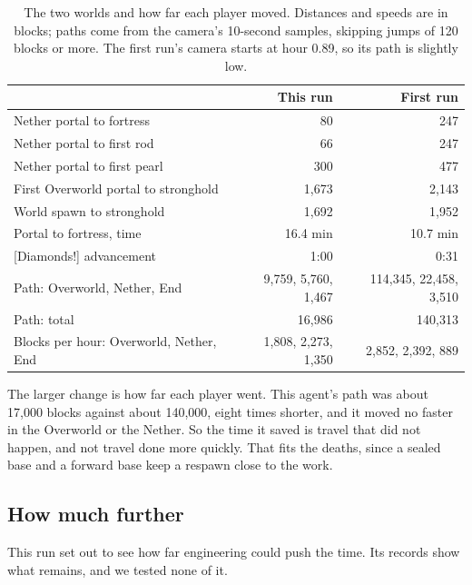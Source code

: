 \documentclass[11pt,a4paper]{article}
\newcommand{\adv}[1]{\mbox{\textsf{[#1]}}}
\begin{document}
\begin{table}[t]
  \caption{The two worlds and how far each player moved. Distances and speeds are in blocks; paths come from the camera's 10-second samples, skipping jumps of 120 blocks or more. The first run's camera starts at hour 0.89, so its path is slightly low.}
  \label{tab:worlds}
  \small
  \begin{tabularx}{\textwidth}{@{}Xrr@{}}
    \toprule
    & \textbf{This run} & \textbf{First run} \\
    \midrule
    Nether portal to fortress & 80 & 247 \\
    Nether portal to first rod & 66 & 247 \\
    Nether portal to first pearl & 300 & 477 \\
    First Overworld portal to stronghold & 1,673 & 2,143 \\
    World spawn to stronghold & 1,692 & 1,952 \\
    Portal to fortress, time & 16.4 min & 10.7 min \\
    \adv{Diamonds!} advancement & 1:00 & 0:31 \\
    \midrule
    Path: Overworld, Nether, End & 9,759, 5,760, 1,467 & 114,345, 22,458, 3,510 \\
    Path: total & 16,986 & 140,313 \\
    Blocks per hour: Overworld, Nether, End & 1,808, 2,273, 1,350 & 2,852, 2,392, 889 \\
    \bottomrule
  \end{tabularx}
\end{table}

The larger change is how far each player went. This agent's path was about 17,000 blocks against about 140,000, eight times shorter, and it moved no faster in the Overworld or the Nether. So the time it saved is travel that did not happen, and not travel done more quickly. That fits the deaths, since a sealed base and a forward base keep a respawn close to the work.

\subsection{How much further}

This run set out to see how far engineering could push the time. Its records show what remains, and we tested none of it.
\end{document}

